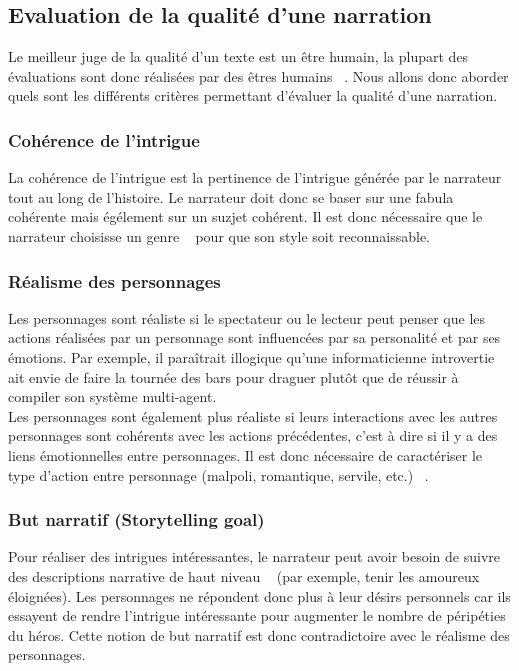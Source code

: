 \documentclass[asi]{picINSA}
\begin{document}
\subsection{Evaluation de la qualité d'une narration}

Le meilleur juge de la qualité d'un texte est un être humain, la plupart des évaluations sont donc réalisées par des êtres humains ~\cite{Callaway2002213}. Nous allons donc aborder quels sont les différents critères permettant d'évaluer la qualité d'une narration.

\subsubsection{Cohérence de l'intrigue}

La cohérence de l'intrigue est la pertinence de l'intrigue générée par le narrateur tout au long de l'histoire. Le narrateur doit donc se baser sur une fabula cohérente mais égélement sur un suzjet cohérent. Il est donc nécessaire que le narrateur choisisse un genre ~\cite{Ciarlini:2010:ERP:1658866.1658874} pour que son style soit reconnaissable.

\subsubsection{Réalisme des personnages}

Les personnages sont réaliste si le spectateur ou le lecteur peut penser que les actions réalisées par un personnage sont influencées par sa personalité et par ses émotions. Par exemple, il paraîtrait illogique qu'une informaticienne introvertie ait envie de faire la tournée des bars pour draguer plutôt que de réussir à compiler son système multi-agent. \\

Les personnages sont également plus réaliste si leurs interactions avec les autres personnages sont cohérents avec les actions précédentes, c'est à dire si il y a des liens émotionnelles entre personnages. Il est donc nécessaire de caractériser le type d'action entre personnage (malpoli, romantique, servile, etc.) ~\cite{IRIS:conf/aamas/CavazzaCM2002}. \\

\subsubsection{But narratif (Storytelling goal)}

Pour réaliser des intrigues intéressantes, le narrateur peut avoir besoin de suivre des descriptions narrative de haut niveau ~\cite{Ciarlini:2010:ERP:1658866.1658874} (par exemple, tenir les amoureux éloignées). Les personnages ne répondent donc plus à leur désirs personnels car ils essayent de rendre l'intrigue intéressante pour augmenter le nombre de péripéties du héros. Cette notion de but narratif est donc contradictoire avec le réalisme des personnages. \\
\end{document}
